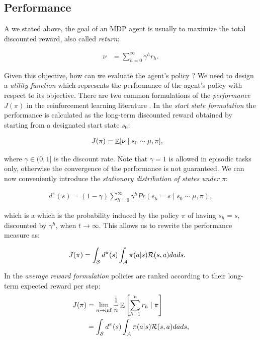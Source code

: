 \subsection{Performance}
A we stated above, the goal of an MDP agent is usually to maximize the total discounted reward, also called \emph{return}:

\begin{align}
\nu &= \sum_{h=0}^{\infty}\gamma^{h}r_{h}.
\end{align}

Given this objective, how can we evaluate the agent's policy ? We need to design a \emph{utility function} which represents the performance of the agent's policy with respect to its objective. There are two common formulations of the \emph{performance} $J(\pi)$ in the reinforcement learning literature \cite{sutton2000policy}.
In the \emph{start state formulation} the performance is calculated as the long-term discounted reward obtained by starting from a designated start state $s_0$:

\begin{align}
J(\pi) &=  \mathop{\mathbb{E}}[\nu\mid s_0\sim\mu,\pi], \label{eq:Jstartstate}
\end{align}


where $\gamma\in(0,1]$ is the discount rate. Note that $\gamma=1$ is allowed in episodic tasks only, otherwise the convergence of the performance is not guaranteed. We can now conveniently introduce the \emph{stationary distribution of states under $\pi$}:

\begin{align} 
d^{\pi}(s) = (1 - \gamma)\sum_{h=0}^{\infty}\gamma^h Pr(s_h=s\mid s_0\sim\mu,\pi) \label{eq:ssdistribution},
\end{align}

which is a which is the probability induced by the policy $\pi$  of having $s_h=s$, discounted by $\gamma^h$, when $t\to\infty$. This allows us to rewrite the performance measure as:

\begin{align}
J(\pi) &=  \int_{\mathcal{S}}d^{\pi}(s)\int_{\mathcal{A}}\pi(a|s)\mathcal{R}(s, a)dads.
\end{align}

In the \emph{average reward formulation} policies are ranked according to their long-term expected reward per step:
\begin{align}
J(\pi)
&=  \lim_{n\to\inf}\frac{1}{n}\mathop{\mathbb{E}}\left[\sum_{h=1}^{n}r_h\mid\pi\right]  \nonumber\\
& = \int_{\mathcal{S}}d^{\pi}(s)\int_{\mathcal{A}}\pi(a|s)\mathcal{R}(s, a)dads,
\end{align}

